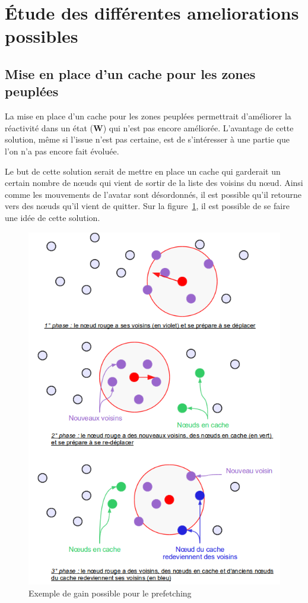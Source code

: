 \newpage
\section{Étude des différentes ameliorations possibles}
\subsection{Mise en place d'un cache pour les zones peuplées}
La mise en place d'un cache pour les zones peuplées permettrait d'améliorer la réactivité dans un état (\textbf{W}) qui n'est pas encore améliorée. L'avantage de cette solution, même si l'issue n'est pas certaine, est de s'intéresser à une partie que l'on n'a pas encore fait évoluée. 
\par Le but de cette solution serait de mettre en place un cache qui garderait un certain nombre de nœuds qui vient de sortir de la liste des voisins du nœud. Ainsi comme les mouvements de l'avatar sont désordonnés, il est possible qu'il retourne vers des nœuds qu'il vient de quitter. Sur la figure~\ref{cacheW}, il est possible de se faire une idée de cette solution.

	\begin{figure}[!h]
        \centering
        \includegraphics[scale=0.40]{./Ressources/Images/cacheW.png}
        \caption{Exemple de gain possible pour le prefetching}
        \label{cacheW}
        \end{figure} 

